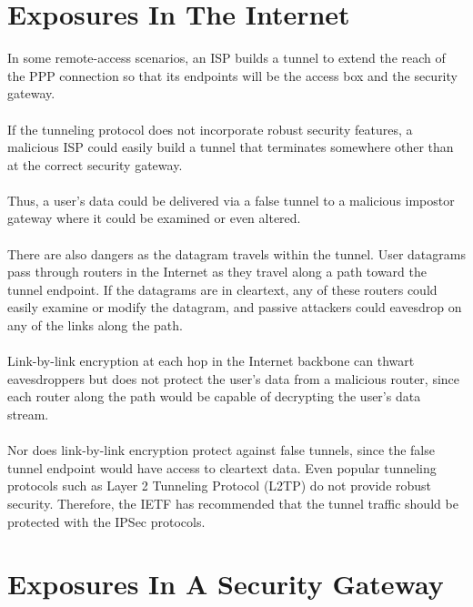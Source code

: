 \documentclass[10pt,a4paper]{article}
\begin{document}
\section{Exposures In The Internet}

In some remote-access scenarios, an ISP builds a tunnel to extend the reach of
the PPP connection so that its endpoints will be the access box and the security
gateway. 
\\
\\
If the tunneling protocol does not incorporate robust security features, a
malicious ISP could easily build a tunnel that terminates somewhere other than at
the correct security gateway. 
\\
\\
Thus, a user's data could be
delivered via a false tunnel to a malicious impostor gateway where it could be
examined or even altered.
\\
\\
There are also dangers as the datagram travels within the tunnel. User datagrams pass through routers in the Internet as they travel along
a path toward the tunnel endpoint. If the datagrams are in cleartext, any of these
routers could easily examine or modify the datagram, and passive attackers
could eavesdrop on any of the links along the path.
\\
\\
Link-by-link encryption at each hop in the Internet backbone can thwart
eavesdroppers but does not protect the user's data from a malicious router, since
each router along the path would be capable of decrypting the user's data stream.
\\
\\
Nor does link-by-link encryption protect against false tunnels, since the false
tunnel endpoint would have access to cleartext data.
Even popular tunneling protocols such as Layer 2 Tunneling Protocol (L2TP) do
not provide robust security. Therefore, the IETF has recommended that the tunnel
traffic should be protected with the IPSec protocols.

\section{Exposures In A Security Gateway}
\end{document}
